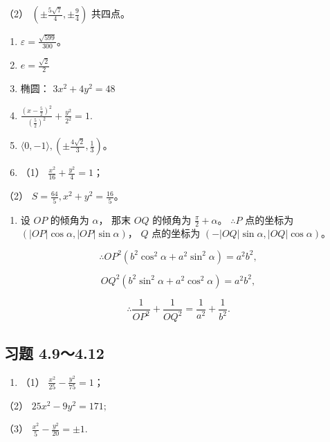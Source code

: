 （2） \(\left(\pm \frac{5\sqrt{7}}{4}, \pm \frac{9}{4}\right)\) 共四点。

\begin{enumerate}
\def\labelenumi{\arabic{enumi}.}
\setcounter{enumi}{5}
\item
  \(\varepsilon = \frac{\sqrt{599}}{300}\)。
\item
  \(e = \frac{\sqrt{2}}{2}\)
\item
  椭圆： \(3x^{2}+4y^{2}=48\)
\item
  \(\frac{\left(x - \frac{5}{2}\right)^2}{\left(\frac{5}{2}\right)^2} + \frac{y^2}{2^2} = 1.\)
\item
  \(\langle 0, -1\rangle, \left(\pm \frac{4\sqrt{2}}{3}, \frac{1}{3}\right)\)。
\item
  （1） \(\frac{x^2}{16} + \frac{y^2}{4} = 1\)；
\end{enumerate}

（2） \(S = \frac{64}{5}, x^2 + y^2 = \frac{16}{5}\)。

\begin{enumerate}
\def\labelenumi{\arabic{enumi}.}
\setcounter{enumi}{11}
\tightlist
\item
  设 \(OP\) 的倾角为 \(\alpha\)， 那末 \(OQ\) 的倾角为
  \(\frac{\pi}{2} + \alpha\)。 \(\therefore P\) 点的坐标为
  \((|OP| \cos \alpha, |OP| \sin \alpha)\)， \(Q\) 点的坐标为
  \((-|OQ| \sin \alpha, |OQ| \cos \alpha)\)。
\end{enumerate}

\[
\therefore OP^{2} (b^{2} \cos^{2} \alpha + a^{2} \sin^{2} \alpha) = a^{2} b^{2},
\]

\[
OQ^{2} (b^{2} \sin^{2} \alpha + a^{2} \cos^{2} \alpha) = a^{2} b^{2},
\]

\[
\therefore \frac {1}{OP^{2}} + \frac {1}{OQ^{2}} = \frac {1}{a^{2}} + \frac {1}{b^{2}}.
\]

\subsection{习题 4.9～4.12}\label{ux4e60ux9898-4.94.12}

\begin{enumerate}
\def\labelenumi{\arabic{enumi}.}
\tightlist
\item
  （1） \(\frac{x^2}{25} - \frac{y^2}{75} = 1\)；
\end{enumerate}

（2） \(25x^{2} - 9y^{2} = 171;\)

（3） \(\frac{x^2}{5} - \frac{y^2}{20} = \pm 1.\)

